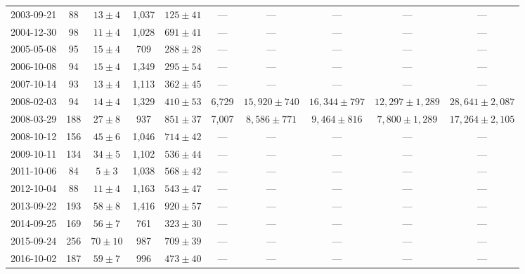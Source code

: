 \begin{landscape}
\begin{longtable}{cccccccccc}
{2003-09-21} & 88 & {$13  \pm  4$} & 1,037 & {$125 \pm 41$} & --- & --- & --- & --- & --- \\
{2004-12-30} & 98 & {$11  \pm  4$} & 1,028 & {$691 \pm 41$} & --- & --- & --- & --- & --- \\
{2005-05-08} & 95 & {$15  \pm  4$} & 709 & {$288 \pm 28$} & --- & --- & --- & --- & --- \\
{2006-10-08} & 94 & {$15  \pm  4$} & 1,349 & {$295 \pm 54$} & --- & --- & --- & --- & --- \\
{2007-10-14} & 93 & {$13  \pm  4$} & 1,113 & {$362 \pm 45$} & --- & --- & --- & --- & --- \\
{2008-02-03} & 94 & {$14  \pm  4$} & 1,329 & {$410 \pm 53$} & 6,729 & {$15,920 \pm 740$} & {$16,344 \pm 797$} & {$12,297 \pm 1,289$} & {$28,641 \pm 2,087$} \\
{2008-03-29} & 188 & {$27  \pm  8$} & 937 & {$851 \pm 37$} & 7,007 & {$8,586 \pm 771$} & {$9,464 \pm 816$} & {$7,800 \pm 1,289$} & {$17,264 \pm 2,105$} \\
{2008-10-12} & 156 & {$45  \pm  6$} & 1,046 & {$714 \pm 42$} & --- & --- & --- & --- & --- \\
{2009-10-11} & 134 & {$34  \pm  5$} & 1,102 & {$536 \pm 44$} & --- & --- & --- & --- & --- \\
{2011-10-06} & 84 & {$5  \pm  3$} & 1,038 & {$568 \pm 42$} & --- & --- & --- & --- & --- \\
{2012-10-04} & 88 & {$11  \pm  4$} & 1,163 & {$543 \pm 47$} & --- & --- & --- & --- & --- \\
{2013-09-22} & 193 & {$58  \pm  8$} & 1,416 & {$920 \pm 57$} & --- & --- & --- & --- & --- \\
{2014-09-25} & 169 & {$56  \pm  7$} & 761 & {$323 \pm 30$} & --- & --- & --- & --- & --- \\
{2015-09-24} & 256 & {$70  \pm  10$} & 987 & {$709 \pm 39$} & --- & --- & --- & --- & --- \\
{2016-10-02} & 187 & {$59  \pm  7$} & 996 & {$473 \pm 40$} & --- & --- & --- & --- & --- \\
\end{longtable} 
\end{landscape} 
